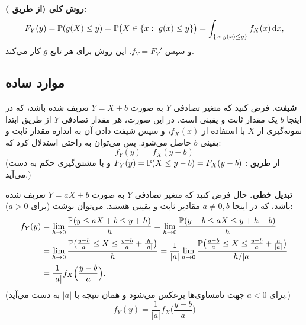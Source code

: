 \begin{center}
\end{center}

\textbf{روش کلی (از طریق ):}
\[
F_Y(y)=\Prob(g(X)\le y)=\Prob\big(X\in\{x:\ g(x)\le y\}\big)=\int_{\{x:\,g(x)\le y\}}f_X(x)\dd x,
\]
و سپس $f_Y=F_Y'$. این روش برای هر تابع $g$ کار می‌کند.

\subsection{موارد ساده}
\textbf{شیفت.} فرض کنید که متغیر تصادفی $Y$ به صورت $Y=X+b$ تعریف شده باشد، که در اینجا $b$ یک مقدار ثابت و یقینی است. در این صورت، هر مقدار تصادفی $Y$ از طریق ابتدا نمونه‌گیری از $X$ با استفاده از $f_X(x)$، و سپس شیفت دادن آن به اندازه مقدار ثابت و یقینی $b$ حاصل می‌شود. پس می‌توان به راحتی استدلال کرد که:
\[
\boxed{\ f_Y(y)=f_X(y-b)\ }
\]
(از طریق : $F_Y(y)=\mathbb{P}(X\le y-b)=F_X(y-b)$ و با مشتق‌گیری حکم به دست می‌آید.)

\textbf{تبدیل خطی.} حال فرض کنید که متغیر تصادفی $Y$ به صورت $Y=aX+b$ تعریف شده باشد، که در اینجا $a\ne0,b$ مقادیر ثابت و یقینی هستند. می‌توان نوشت (برای $a>0$):
\[
\begin{aligned}
f_Y(y)&=\lim_{h\to0}\frac{\mathbb{P}(y\le aX+b\le y+h)}{h}=\lim_{h\to0}\frac{\mathbb{P}(y-b\le aX\le y+h-b)}{h}\\
&=\lim_{h\to0}\frac{\mathbb{P}\big(\frac{y-b}{a}\le X\le\frac{y-b}{a}+\frac{h}{|a|}\big)}{h}
=\frac{1}{|a|}\lim_{h\to0}\frac{\mathbb{P}\big(\frac{y-b}{a}\le X\le\frac{y-b}{a}+\frac{h}{|a|}\big)}{h/|a|}\\
&=\frac{1}{|a|}f_X\Big(\frac{y-b}{a}\Big).
\end{aligned}
\]
(برای $a<0$ جهت نامساوی‌ها برعکس می‌شود و همان نتیجه با $|a|$ به دست می‌آید.)
\[
\boxed{\ f_Y(y)=\frac{1}{|a|}f_X\Big(\frac{y-b}{a}\Big)\ }
\]

